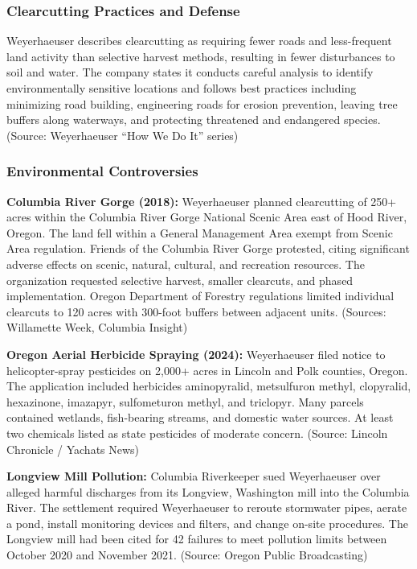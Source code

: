 \documentclass[11pt,letterpaper]{article}
\begin{document}
\subsubsection{Clearcutting Practices and Defense}

Weyerhaeuser describes clearcutting as requiring fewer roads and less-frequent land activity than selective harvest methods, resulting in fewer disturbances to soil and water. The company states it conducts careful analysis to identify environmentally sensitive locations and follows best practices including minimizing road building, engineering roads for erosion prevention, leaving tree buffers along waterways, and protecting threatened and endangered species. (Source: Weyerhaeuser ``How We Do It'' series)

\subsubsection{Environmental Controversies}

\textbf{Columbia River Gorge (2018):} Weyerhaeuser planned clearcutting of 250+ acres within the Columbia River Gorge National Scenic Area east of Hood River, Oregon. The land fell within a General Management Area exempt from Scenic Area regulation. Friends of the Columbia River Gorge protested, citing significant adverse effects on scenic, natural, cultural, and recreation resources. The organization requested selective harvest, smaller clearcuts, and phased implementation. Oregon Department of Forestry regulations limited individual clearcuts to 120 acres with 300-foot buffers between adjacent units. (Sources: Willamette Week, Columbia Insight)

\textbf{Oregon Aerial Herbicide Spraying (2024):} Weyerhaeuser filed notice to helicopter-spray pesticides on 2,000+ acres in Lincoln and Polk counties, Oregon. The application included herbicides aminopyralid, metsulfuron methyl, clopyralid, hexazinone, imazapyr, sulfometuron methyl, and triclopyr. Many parcels contained wetlands, fish-bearing streams, and domestic water sources. At least two chemicals listed as state pesticides of moderate concern. (Source: Lincoln Chronicle / Yachats News)

\textbf{Longview Mill Pollution:} Columbia Riverkeeper sued Weyerhaeuser over alleged harmful discharges from its Longview, Washington mill into the Columbia River. The settlement required Weyerhaeuser to reroute stormwater pipes, aerate a pond, install monitoring devices and filters, and change on-site procedures. The Longview mill had been cited for 42 failures to meet pollution limits between October 2020 and November 2021. (Source: Oregon Public Broadcasting)
\end{document}

